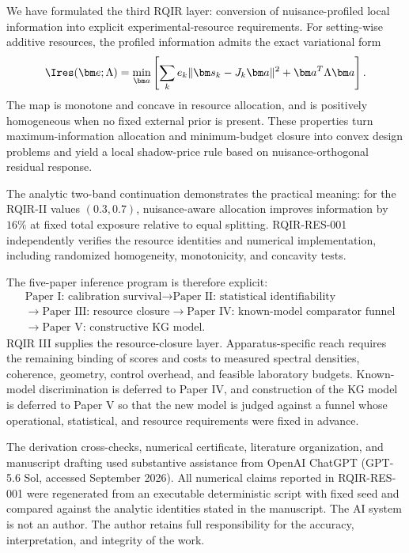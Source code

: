 We have formulated the third RQIR layer: conversion of nuisance-profiled local information into explicit experimental-resource requirements. For setting-wise additive resources, the profiled information admits the exact variational form
\begin{equation}
\Ires(\bm e;\Lambda)=
\min_{\bm a}
\left[
\sum_k e_k\|\bm s_k-J_k\bm a\|^2+\bm a^T\Lambda\bm a
\right].
\end{equation}
The map is monotone and concave in resource allocation, and is positively homogeneous when no fixed external prior is present. These properties turn maximum-information allocation and minimum-budget closure into convex design problems and yield a local shadow-price rule based on nuisance-orthogonal residual response.

The analytic two-band continuation demonstrates the practical meaning: for the RQIR-II values $(0.3,0.7)$, nuisance-aware allocation improves information by $16\%$ at fixed total exposure relative to equal splitting. RQIR-RES-001 independently verifies the resource identities and numerical implementation, including randomized homogeneity, monotonicity, and concavity tests.

The five-paper inference program is therefore explicit:
\begin{equation}
\begin{split}
&\text{Paper I: calibration survival}
\rightarrow
\text{Paper II: statistical identifiability}
\\
&\rightarrow
\text{Paper III: resource closure}
\rightarrow
\text{Paper IV: known-model comparator funnel}
\\
&\rightarrow
\text{Paper V: constructive KG model}.
\end{split}
\end{equation}
RQIR III supplies the resource-closure layer. Apparatus-specific reach requires the remaining binding of scores and costs to measured spectral densities, coherence, geometry, control overhead, and feasible laboratory budgets. Known-model discrimination is deferred to Paper IV, and construction of the KG model is deferred to Paper V so that the new model is judged against a funnel whose operational, statistical, and resource requirements were fixed in advance.

\begin{acknowledgments}
The derivation cross-checks, numerical certificate, literature organization, and manuscript drafting used substantive assistance from OpenAI ChatGPT (GPT-5.6 Sol, accessed September 2026). All numerical claims reported in RQIR-RES-001 were regenerated from an executable deterministic script with fixed seed and compared against the analytic identities stated in the manuscript. The AI system is not an author. The author retains full responsibility for the accuracy, interpretation, and integrity of the work.
\end{acknowledgments}

